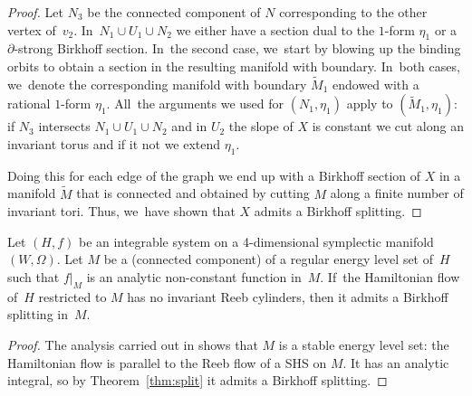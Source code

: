 \begin{proof}
Let $N_3$ be the connected component of $N$ corresponding to the other vertex of~$v_2$. In~$N_1\cup U_1\cup N_2$ we either have a section dual to the $1$-form $\eta_1$ or a $\partial$-strong Birkhoff section. In~the second case, we~start by blowing up the binding orbits to obtain a section in the resulting manifold with boundary. In~both cases, we~denote the corresponding manifold with boundary $\widetilde{M}_1$ endowed with a rational $1$-form $\eta_1$.
All~the arguments we used for $(N_1,\eta_1)$ apply to $(\widetilde{M}_1,\eta_1)$: if $N_3$ intersects $N_1\cup U_1\cup N_2$ and in $U_2$ the slope of $X$ is constant we cut along an invariant torus and if it not we extend $\eta_1$.

Doing this for each edge of the graph we end up
with a Birkhoff section of $X$ in a manifold $\widetilde M$ that is connected and obtained by cutting $M$ along a finite number of invariant tori. Thus, we~have shown that $X$ admits a Birkhoff splitting.
\end{proof}

\begin{Corollary}
Let $(H,f)$ be an integrable system on a 4-dimensional symplectic manifold $(W,\Omega)$. Let $M$ be a (connected component) of a regular energy level set of~$H$ such that $f|_M$ is an analytic non-constant function in~$M$. If~the Hamiltonian flow of~$H$ restricted to $M$ has no invariant Reeb cylinders, then it admits a Birkhoff splitting in~$M$.
\end{Corollary}

\begin{proof}
The analysis carried out in \cite[\S\S 2 \& 3]{CV2} shows that $M$ is a stable energy level set: the Hamiltonian flow is parallel to the Reeb flow of a SHS on $M$. It has an analytic integral, so by Theorem~\ref{thm:split} it admits a Birkhoff splitting.
\end{proof}

